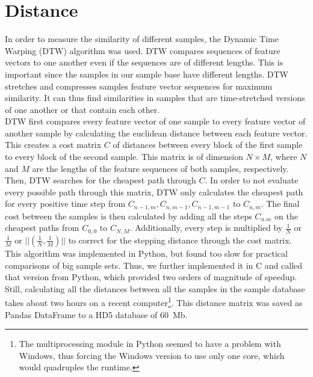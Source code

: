 \section{Distance}
\label{sec:Distance}

In order to measure the similarity of different samples, the Dynamic Time Warping (DTW) algorithm was used. DTW compares sequences of feature vectors to one another even if the sequences are of different lengths. This is important since the samples in our sample base have different lengths. DTW stretches and compresses samples feature vector sequences for maximum similarity. It can thus find similarities in samples that are time-stretched versions of one another or that contain each other.\\
DTW first compares every feature vector of one sample to every feature vector of another sample by calculating the euclidean distance between each feature vector. This creates a cost matrix $C$ of distances between every block of the first sample to every block of the second sample. This matrix is of dimension $N \times M$, where $N$ and $M$ are the lengths of the feature sequences of both samples, respectively.\\
Then, DTW searches for the cheapest path through $C$. In order to not evaluate every possible path through this matrix, DTW only calculates the cheapest path for every positive time step from $C_{n-1,m}, C_{n,m-1}, C_{n-1,m-1}$ to $C_{n,m}$. The final cost between the samples is then calculated by adding all the steps $C_{n.m}$ on the cheapest paths from $C_{0,0}$ to $C_{N,M}$. Additionally, every step is multiplied by $\frac{1}{N}$ or $\frac{1}{M}$ or $||(\frac{1}{N},\frac{1}{M})||$ to correct for the stepping distance through the cost matrix.\\
This algorithm was implemented in Python, but found too slow for practical comparisons of big sample sets. Thus, we further implemented it in C and called that version from Python, which provided two orders of magnitude of speedup. Still, calculating all the distances between all the samples in the sample database takes about two hours on a recent computer\footnote{The multiprocessing module in Python seemed to have a problem with Windows, thus forcing the Windows version to use only one core, which would quadruples the runtime.}. This distance matrix was saved as Pandas DataFrame to a HD5 database of 60~Mb.